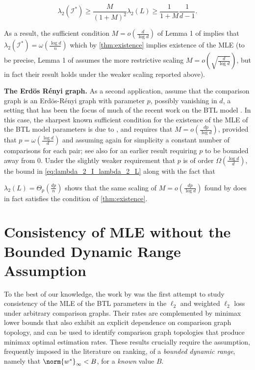 \begin{equation} \label{eq:lambda_2_I_lambda_2_L}
    \lambda_2(\mathcal{I}^*) \geq \frac{M}{(1+M)^2} \lambda_2(L) \geq \frac{1}{1+M} \frac{1}{d-1}.
\end{equation}

As a result, the sufficient condition $M = o\left(\frac{d}{\log d}\right)$ of Lemma 1 of \cite{simons1999asymptotics} implies that $\lambda_2(\mathcal{I}^*) = \omega(\frac{\log d}{n} )$ which by \ref{thm:existence} implies existence of the MLE (to be precise, Lemma 1 of \cite{simons1999asymptotics} assumes the more restrictive scaling $M = o\left(\sqrt{\frac{d}{ \log d}}\right)$, but in fact their result holds under the weaker scaling reported above). 

 {\bf The Erd\"os R\'enyi graph.} As a second application, assume that the comparison graph is an  Erd\"os-R\'enyi graph with parameter $p$, possibly vanishing in $d$, a setting that has been the focus of much of the recent work on the BTL model \citep{negahban2012iterative,yan2012sparse,han2020asymptotic}. In this case, the sharpest known sufficient condition for the existence of the MLE of the BTL model parameters is due to \cite{han2020asymptotic}, and requires that $M = o(\frac{dp}{\log d})$, provided that $p = \omega(\frac{\log d}{d})$ and assuming again for simplicity a constant number of comparisons for each pair; see also \cite{yan2012sparse} for an earlier result requiring $p$ to be bounded away from $0$. Under the slightly weaker requirement that $p$ is of order  $\Omega (\frac{\log d}{d})$, the bound in  \eqref{eq:lambda_2_I_lambda_2_L} along with  the fact that

$\lambda_2(L) = \Theta_p(\frac{dp}{n})$ \citep[a fact that can be deduced from][after noting that we use a different normalization for the Laplacian]{kolokolnikov2014algebraic} shows that the same scaling of $M = o\left(\frac{dp}{\log d}\right)$ found by \citet{han2020asymptotic} does in fact satisfies the condition of \ref{thm:existence}.  

\section{Consistency of MLE without the Bounded Dynamic Range Assumption} \label{sec:consistency}

To the best of our knowledge, the work by \citet{shah2016estimation} was the first attempt to study  consistency of the MLE  of the BTL parameters in the $\ell_2$ and weighted $\ell_2$ loss  under arbitrary comparison graphs. Their rates are complemented by minimax lower bounds that also exhibit an explicit dependence on comparison graph topology, and can be used to identify comparison graph topologies  that produce  minimax optimal estimation rates. These results crucially require the assumption, frequently imposed in the literature on ranking,  of  a {\it bounded dynamic range}, namely that  $\norm{w^*}_\infty < B$, for a {\it known} value $B$. 

